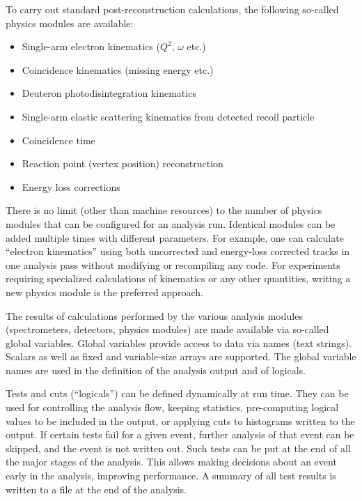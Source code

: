 {{To carry out standard post-reconstruction calculations, the following
so-called physics modules are available:
\begin{itemize} \setlength{\parskip}{0ex}
  \item Single-arm electron kinematics ($Q^2$, $\omega$ etc.)
  \item Coincidence kinematics (missing energy etc.)
  \item Deuteron photodisintegration kinematics
  \item Single-arm elastic scattering kinematics from detected recoil
          particle 
  \item Coincidence time
  \item Reaction point (vertex position) reconstruction 
  \item Energy loss corrections
\end{itemize}
There is no limit (other than machine resources) to the number of physics 
modules that can be configured for an analysis run.
Identical modules can be added multiple times with different parameters.
For example, one can calculate ``electron kinematics'' using both uncorrected
and energy-loss corrected tracks in one analysis pass without modifying
or recompiling any code. For experiments requiring
specialized calculations of kinematics or any other quantities,
writing a new physics module is the preferred approach. 

The results of calculations performed by the various analysis modules 
(spectrometers, detectors, physics modules) are made available via 
so-called global variables. 
Global variables provide access to data via names (text strings). 
Scalars as well as fixed and variable-size arrays are supported.
The global variable names are used in the definition of the analysis output
and of logicals. 

Tests and cuts (``logicals'') can be defined
dynamically at run time. They can be used for controlling the analysis flow,
keeping statistics, pre-computing logical values to be included in the output,
or applying cuts to histograms written to the output.
If certain tests fail for a given event, further analysis of that
event can be skipped, and the event is not written out.  Such tests
can be put at the end of all the major stages of the analysis.  This
allows making decisions about an event early in the analysis,
improving performance.  A summary of all test results is written to a
file at the end of the analysis.

}}
